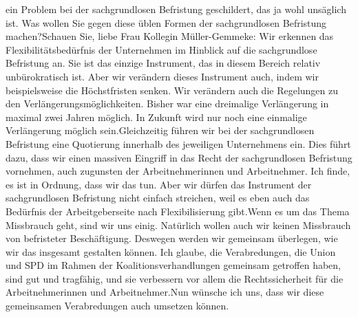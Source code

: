 \documentclass{article}
\begin{document}
ein Problem bei der sachgrundlosen Befristung geschildert, das ja wohl unsäglich ist. Was wollen Sie gegen diese üblen Formen der sachgrundlosen Befristung machen?Schauen Sie, liebe Frau Kollegin Müller-Gemmeke: Wir erkennen das Flexibilitätsbedürfnis der Unternehmen im Hinblick auf die sachgrundlose Befristung an. Sie ist das einzige Instrument, das in diesem Bereich relativ unbürokratisch ist. Aber wir verändern dieses Instrument auch, indem wir beispielsweise die Höchstfristen senken. Wir verändern auch die Regelungen zu den Verlängerungsmöglichkeiten. Bisher war eine dreimalige Verlängerung in maximal zwei Jahren möglich. In Zukunft wird nur noch eine einmalige Verlängerung möglich sein.Gleichzeitig führen wir bei der sachgrundlosen Befristung eine Quotierung innerhalb des jeweiligen Unternehmens ein. Dies führt dazu, dass wir einen massiven Eingriff in das Recht der sachgrundlosen Befristung vornehmen, auch zugunsten der Arbeitnehmerinnen und Arbeitnehmer. Ich finde, es ist in Ordnung, dass wir das tun. Aber wir dürfen das Instrument der sachgrundlosen Befristung nicht einfach streichen, weil es eben auch das Bedürfnis der Arbeitgeberseite nach Flexibilisierung gibt.Wenn es um das Thema Missbrauch geht, sind wir uns einig. Natürlich wollen auch wir keinen Missbrauch von befristeter Beschäftigung. Deswegen werden wir gemeinsam überlegen, wie wir das insgesamt gestalten können. Ich glaube, die Verabredungen, die Union und SPD im Rahmen der Koalitionsverhandlungen gemeinsam getroffen haben, sind gut und tragfähig, und sie verbessern vor allem die Rechtssicherheit für die Arbeitnehmerinnen und Arbeitnehmer.Nun wünsche ich uns, dass wir diese gemeinsamen Verabredungen auch umsetzen können.
\end{document}
